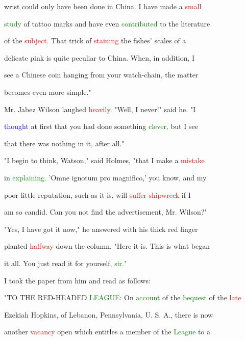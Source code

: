  wrist could only have been done in China. I have made a \textcolor{red}{small}

 \textcolor{green}{study} of tattoo marks and have even \textcolor{green}{contributed} to the literature

 of the \textcolor{red}{subject.} That \textcolor{BurntOrange}{trick} of \textcolor{red}{staining} the fishes' scales of a

 delicate pink is quite peculiar to China. When, in addition, I

 see a Chinese coin hanging from your watch-chain, the matter

 becomes even more simple."



 Mr. Jabez Wilson \textcolor{BurntOrange}{laughed} \textcolor{red}{heavily.} "Well, I never!" said he. "I

 \textcolor{blue}{thought} at first that you had done something \textcolor{green}{clever,} but I see

 that there was nothing in it, after all."



 "I begin to think, Watson," said Holmes, "that I make a \textcolor{red}{mistake}

 in \textcolor{green}{explaining.} 'Omne ignotum pro magnifico,' you know, and my

 poor little reputation, such as it is, will \textcolor{red}{suffer} \textcolor{red}{shipwreck} if I

 am so \textcolor{BurntOrange}{candid.} Can you not find the advertisement, Mr. Wilson?"



 "Yes, I have got it now," he answered with his thick red finger

 planted \textcolor{red}{halfway} down the column. "Here it is. This is what began

 it all. You just read it for yourself, \textcolor{green}{sir."}



 I took the paper from him and read as follows:



 "TO THE RED-HEADED \textcolor{green}{LEAGUE:} On \textcolor{green}{account} of the \textcolor{green}{bequest} of the \textcolor{red}{late}

 Ezekiah Hopkins, of Lebanon, Pennsylvania, U. S. A., there is now

 another \textcolor{red}{vacancy} open which entitles a member of the \textcolor{green}{League} to a

